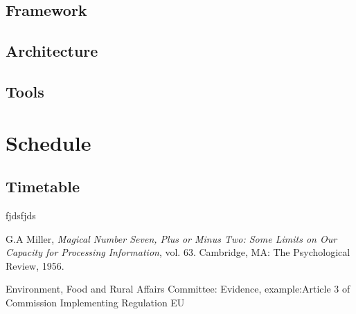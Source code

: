 \documentclass[a4paper, 11pt]{article}
\begin{document}
\subsection{Framework}
\subsection{Architecture}
\subsection{Tools}

\clearpage

\section{Schedule}
\subsection{Timetable}

\clearpage

\begin{thebibliography}{11}

	fjdsfjds
	
	G.A Miller, \emph{Magical Number Seven, Plus or Minus Two: Some Limits on Our Capacity for Processing Information}, vol. 63. Cambridge, MA: The Psychological Review, 1956.

Environment, Food and Rural Affairs Committee: Evidence,
example:Article 3 of Commission Implementing Regulation EU


\end{thebibliography}
\end{document}
